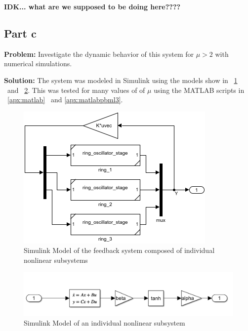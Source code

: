 \documentclass[letter]{article}
\begin{document}
\textbf{IDK... what are we supposed to be doing here????}









\newpage
\subsection{Part c}
\textbf{Problem:}
Investigate the dynamic behavior of this system for $\mu > 2$ with numerical simulations.

\noindent
\textbf{Solution:}
The system was modeled in Simulink using the models show in \figurename \ \ref{fig:simmodelhw6pblm3} \ and \figurename \ \ref{fig:simmodelhw6pblm3subsystem}. This was tested for many values of of $\mu$ using the MATLAB scripts in \appendixname \ \ref{apx:matlab} \ and \ref{apx:matlabpbml3}.

\begin{figure}[h]
	\centering
	\includegraphics[width=0.7\linewidth]{fig/sim_model_HW6_pblm3}
	\caption{Simulink Model of the feedback system composed of individual nonlinear subsystems}
	\label{fig:simmodelhw6pblm3}
\end{figure}

\begin{figure}[h]
	\centering
	\includegraphics[width=0.7\linewidth]{fig/sim_model_HW6_pblm3_subsystem}
	\caption{Simulink Model of an individual nonlinear subsystem}
	\label{fig:simmodelhw6pblm3subsystem}
\end{figure}
\end{document}
